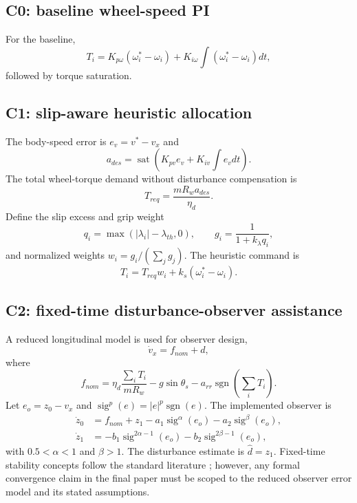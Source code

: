 \documentclass[11pt]{article}
\newcommand{\sigp}[2]{\operatorname{sig}^{#2}(#1)}
\begin{document}
\subsection{C0: baseline wheel-speed PI}
For the baseline,
\begin{equation}
T_i = K_{p\omega}(\omega_i^*-\omega_i)
+K_{i\omega}\int(\omega_i^*-\omega_i)dt,
\end{equation}
followed by torque saturation.

\subsection{C1: slip-aware heuristic allocation}
The body-speed error is $e_v=v^*-v_x$ and
\begin{equation}
a_{des}=\operatorname{sat}\!\left(K_{pv}e_v+K_{iv}\int e_vdt\right).
\end{equation}
The total wheel-torque demand without disturbance compensation is
\begin{equation}
T_{req}=\frac{mR_w a_{des}}{\eta_d}.
\end{equation}
Define the slip excess and grip weight
\begin{equation}
q_i=\max(|\lambda_i|-\lambda_{th},0),\qquad
g_i=\frac{1}{1+k_\lambda q_i},
\end{equation}
and normalized weights $w_i=g_i/(\sum_jg_j)$. The heuristic command is
\begin{equation}
T_i=T_{req}w_i+k_s(\omega_i^*-\omega_i).
\end{equation}

\subsection{C2: fixed-time disturbance-observer assistance}
A reduced longitudinal model is used for observer design,
\begin{equation}
\dot v_x=f_{nom}+d,
\end{equation}
where
\begin{equation}
f_{nom}=\eta_d\frac{\sum_iT_i}{mR_w}-g\sin\theta_s-a_{rr}\operatorname{sgn}\!\left(\sum_iT_i\right).
\end{equation}
Let $e_o=z_0-v_x$ and $\sigp{e}{p}=|e|^p\operatorname{sgn}(e)$. The implemented observer is
\begin{align}
\dot z_0 &= f_{nom}+z_1-a_1\sigp{e_o}{\alpha}-a_2\sigp{e_o}{\beta},\\
\dot z_1 &= -b_1\sigp{e_o}{2\alpha-1}-b_2\sigp{e_o}{2\beta-1},
\end{align}
with $0.5<\alpha<1$ and $\beta>1$. The disturbance estimate is $\hat d=z_1$. Fixed-time stability concepts follow the standard literature \cite{polyakov2012fixed}; however, any formal convergence claim in the final paper must be scoped to the reduced observer error model and its stated assumptions.
\end{document}
